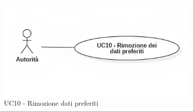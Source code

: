 \begin{figure}[H]
    \centering
    \includegraphics[width=0.9\textwidth]{../Images/uc10.png}
    \caption{UC10 - Rimozione dati preferiti}
    \label{fig:UC10}
\end{figure}


\setcounter{rowcounter}{1}

